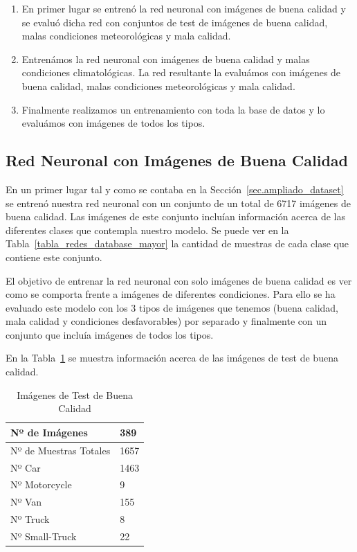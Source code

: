 \begin{enumerate}
    \item En primer lugar se entrenó la red neuronal con imágenes de buena calidad y se evaluó dicha red con  conjuntos de test de imágenes de buena calidad, malas condiciones meteorológicas y mala calidad.
    \item Entrenámos la red neuronal con imágenes de buena calidad y malas condiciones climatológicas. La red resultante la evaluámos con imágenes de buena calidad, malas condiciones meteorológicas y mala calidad.
    \item Finalmente realizamos un entrenamiento con toda la base de datos y lo evaluámos con imágenes de todos los tipos.
\end{enumerate}

\subsection{Red Neuronal con Imágenes de Buena Calidad}

En un primer lugar tal y como se contaba en la Sección~\ref{sec.ampliado_dataset} se entrenó nuestra red neuronal con un conjunto de un total de 6717 imágenes de buena calidad. Las imágenes de este conjunto incluían información acerca de las diferentes clases que contempla nuestro modelo. Se puede ver en la Tabla~\ref{tabla_redes_database_mayor} la cantidad de muestras de cada clase que contiene este conjunto.

El objetivo de entrenar la red neuronal con solo imágenes de buena calidad es ver como se comporta frente a imágenes de diferentes condiciones. Para ello se ha evaluado este modelo con los 3 tipos de imágenes que tenemos (buena calidad, mala calidad y condiciones desfavorables) por separado y finalmente con un conjunto que incluía imágenes de todos los tipos.

En la Tabla~\ref{tab_img_test_buenas} se muestra información acerca de las imágenes de test de buena calidad.
\begin{table}[H] 
\begin{center}
\begin{tabular}{|l|l|}
\hline
Nº de Imágenes  & 389 \\
\hline \hline
Nº de Muestras Totales & 1657\\ \hline
Nº Car & 1463 \\ \hline
Nº Motorcycle & 9 \\ \hline
Nº Van & 155 \\ \hline
Nº Truck & 8 \\ \hline
Nº Small-Truck & 22 \\ \hline
\end{tabular}
\caption{Imágenes de Test de Buena Calidad}
\label{tab_img_test_buenas}
\end{center}
\end{table}

